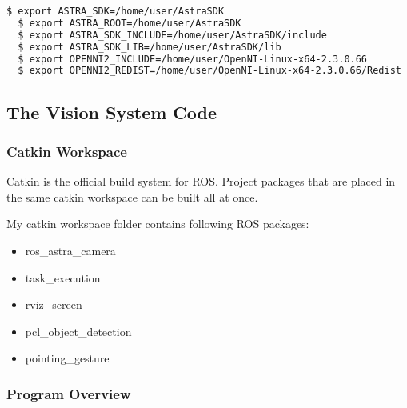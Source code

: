 \begin{lstlisting}[language=bash]
  $ export ASTRA_SDK=/home/user/AstraSDK
  $ export ASTRA_ROOT=/home/user/AstraSDK
  $ export ASTRA_SDK_INCLUDE=/home/user/AstraSDK/include
  $ export ASTRA_SDK_LIB=/home/user/AstraSDK/lib
  $ export OPENNI2_INCLUDE=/home/user/OpenNI-Linux-x64-2.3.0.66
  $ export OPENNI2_REDIST=/home/user/OpenNI-Linux-x64-2.3.0.66/Redist
\end{lstlisting}

\subsection{The Vision System Code}

\subsubsection{Catkin Workspace} 
Catkin is the official build system for ROS. Project packages that are placed in the same catkin workspace can be built all at once.\par
My catkin workspace folder contains following ROS packages: \par

\begin{itemize}
	\item ros\_astra\_camera
    \item task\_execution
    \item rviz\_screen
    \item pcl\_object\_detection
    \item pointing\_gesture
\end{itemize}

\subsubsection{Program Overview} 
  
